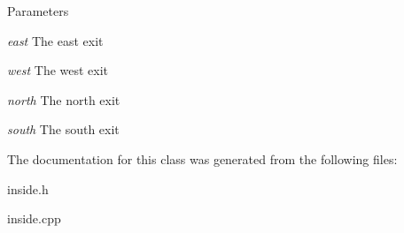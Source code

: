 \begin{DoxyParams}{Parameters}
\item[{\em east}]The east exit \item[{\em west}]The west exit \item[{\em north}]The north exit \item[{\em south}]The south exit \end{DoxyParams}


The documentation for this class was generated from the following files:\begin{DoxyCompactItemize}
\item 
inside.h\item 
inside.cpp\end{DoxyCompactItemize}
